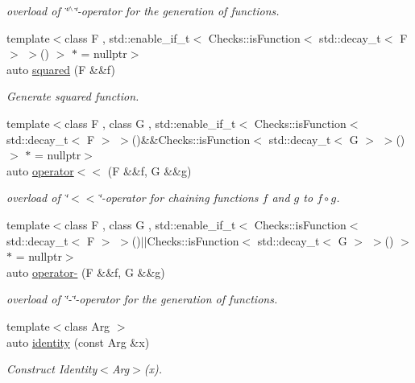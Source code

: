 \begin{DoxyCompactItemize}
\begin{DoxyCompactList}\small\item\em overload of \char`\"{}$^\wedge$\char`\"{}-\/operator for the generation of functions. \end{DoxyCompactList}\item 
{\footnotesize template$<$class F , std\+::enable\+\_\+if\+\_\+t$<$ Checks\+::is\+Function$<$ std\+::decay\+\_\+t$<$ F $>$ $>$() $>$ $\ast$  = nullptr$>$ }\\auto \hyperlink{namespaceFunG_ac4ffc0754104af6ddf114e154251db78}{squared} (F \&\&f)
\begin{DoxyCompactList}\small\item\em Generate squared function. \end{DoxyCompactList}\item 
{\footnotesize template$<$class F , class G , std\+::enable\+\_\+if\+\_\+t$<$ Checks\+::is\+Function$<$ std\+::decay\+\_\+t$<$ F $>$ $>$()\&\&\+Checks\+::is\+Function$<$ std\+::decay\+\_\+t$<$ G $>$ $>$() $>$ $\ast$  = nullptr$>$ }\\auto \hyperlink{namespaceFunG_a65436d4494e99629b0177d0df7634a6b}{operator$<$$<$} (F \&\&f, G \&\&g)
\begin{DoxyCompactList}\small\item\em overload of \char`\"{}$<$$<$\char`\"{}-\/operator for chaining functions $f$ and $g$ to $ f \circ g $. \end{DoxyCompactList}\item 
{\footnotesize template$<$class F , class G , std\+::enable\+\_\+if\+\_\+t$<$ Checks\+::is\+Function$<$ std\+::decay\+\_\+t$<$ F $>$ $>$()$\vert$$\vert$\+Checks\+::is\+Function$<$ std\+::decay\+\_\+t$<$ G $>$ $>$() $>$ $\ast$  = nullptr$>$ }\\auto \hyperlink{namespaceFunG_a3af04c2ef5c1b206feb75fffd298cbbf}{operator-\/} (F \&\&f, G \&\&g)
\begin{DoxyCompactList}\small\item\em overload of \char`\"{}-\/\char`\"{}-\/operator for the generation of functions. \end{DoxyCompactList}\item 
{\footnotesize template$<$class Arg $>$ }\\auto \hyperlink{namespaceFunG_a165e879e76d3a2a8906938f3658445ce}{identity} (const Arg \&x)
\begin{DoxyCompactList}\small\item\em Construct Identity$<$\+Arg$>$(x). \end{DoxyCompactList}\item 

\end{DoxyCompactItemize}
